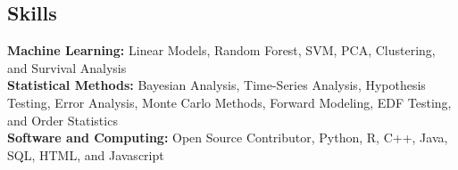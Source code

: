 \documentclass[margin,line, 12pt]{res}
\newenvironment{list2}{
  \begin{list}{$\bullet$}{%
      \setlength{\itemsep}{0.05in}
      \setlength{\parsep}{0in} \setlength{\parskip}{0in}
      \setlength{\topsep}{0.0in} \setlength{\partopsep}{0in}
      \setlength{\leftmargin}{0.2in}}}{\end{list}}
\begin{document}
\begin{spacing}{1.0}
\begin{resume}


\section{Skills}
\textbf{Machine Learning:} Linear Models, Random Forest, SVM, PCA, Clustering, and Survival Analysis\\
\textbf{Statistical Methods:} Bayesian Analysis, Time-Series Analysis, Hypothesis Testing, Error Analysis, Monte Carlo Methods, Forward Modeling, EDF Testing, and Order Statistics\\
\textbf{Software and Computing:} Open Source Contributor, Python, R, C++, Java, SQL, HTML, and Javascript \\
\vspace*{-7mm}



\end{resume}
\end{spacing}
\end{document}
